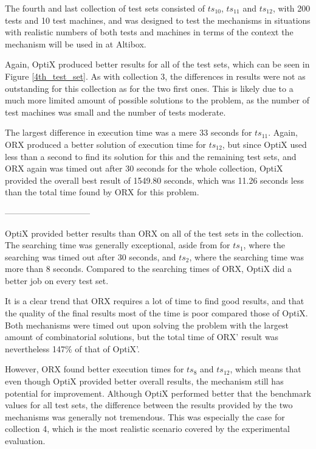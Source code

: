 The fourth and last collection of test sets consisted of $ts_{10}$, $ts_{11}$ and $ts_{12}$, with 200 tests and 10 test machines, and was designed to test the mechanisms in situations with realistic numbers of both tests and machines in terms of the context the mechanism will be used in at Altibox.

Again, OptiX produced better results for all of the test sets, which can be seen in Figure \ref{4th_test_set}. As with collection 3, the differences in results were not as outstanding for this collection as for the two first ones. This is likely due to a much more limited amount of possible solutions to the problem, as the number of test machines was small and the number of tests moderate.

The largest difference in execution time was a mere 33 seconds for $ts_{11}$. Again, ORX produced a better solution of execution time for $ts_{12}$, but since OptiX used less than a second to find its solution for this and the remaining test sets, and ORX again was timed out after 30 seconds for the whole collection, OptiX provided the overall best result of 1549.80 seconds, which was 11.26 seconds less than the total time found by ORX for this problem.

\begin{center}------------------------------\end{center}

\noindent OptiX provided better results than ORX on all of the test sets in the collection. The searching time was generally exceptional, aside from for $ts_1$, where the searching was timed out after 30 seconds, and $ts_2$, where the searching time was more than 8 seconds. Compared to the searching times of ORX, OptiX did a better job on every test set.

It is a clear trend that ORX requires a lot of time to find good results, and that the quality of the final results most of the time is poor compared those of OptiX. Both mechanisms were timed out upon solving the problem with the largest amount of combinatorial solutions, but the total time of ORX' result was nevertheless 147\% of that of OptiX'.

However, ORX found better execution times for $ts_8$ and $ts_12$, which means that even though OptiX provided better overall results, the mechanism still has potential for improvement. Although OptiX performed better that the benchmark values for all test sets, the difference between the results provided by the two mechanisms was generally not tremendous. This was especially the case for collection 4, which is the most realistic scenario covered by the experimental evaluation.

